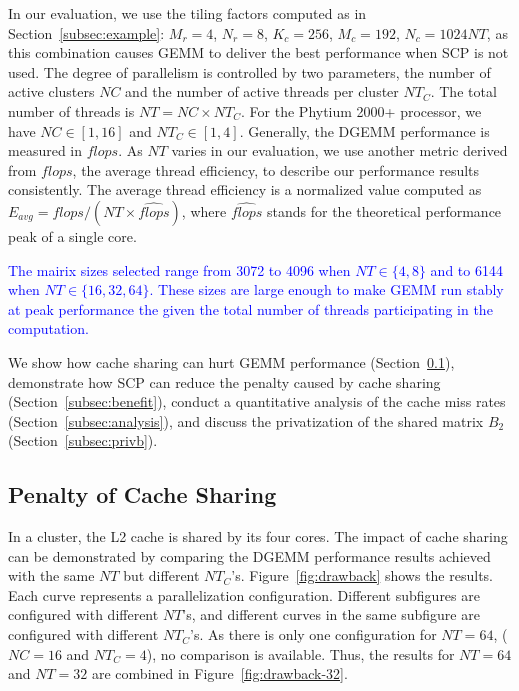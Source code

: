 In our evaluation, we use the tiling factors
computed as in Section~\ref{subsec:example}:
$M_r = 4$, $N_r = 8$, $K_c = 256$, $M_c = 192$, $N_c = 1024NT$,
as this combination causes GEMM to deliver the best performance 
when SCP is not used.
The degree of parallelism is controlled by two parameters,
the number of active clusters $NC$
and the number of active threads per cluster $NT_C$.
The total number of threads is $NT = NC \times NT_C$.
For the Phytium 2000+ processor, we have
$NC \in [1, 16]$ and $NT_C \in [1, 4]$. 
Generally, the DGEMM performance is measured in $flops$.
As $NT$ varies in our evaluation,
we use another metric derived from $flops$,
the average thread efficiency,
to describe our performance results consistently.
The average thread efficiency is a normalized value computed as
$E_{avg} = flops / (NT \times \widehat{flops})$,
where $\widehat{flops}$ stands for the theoretical performance
peak of a single core.

\textcolor{blue}{
The mairix sizes selected range from 3072 to 
4096 when $NT \in \{4, 8\}$ and to 
6144 when $NT \in \{16, 32, 64\}$. 
These sizes are large enough to make GEMM run stably at peak performance
the given the total number of threads participating in the computation.
}

We show how cache sharing can hurt GEMM performance
(Section~\ref{subsec:drawback}),
demonstrate how SCP can reduce
the penalty caused by cache sharing 
(Section~\ref{subsec:benefit}), conduct a 
quantitative analysis of the cache miss rates
(Section~\ref{subsec:analysis}), and
discuss the privatization of the shared matrix $B_2$
(Section~\ref{subsec:privb}).

\subsection{Penalty of Cache Sharing}\label{subsec:drawback}

In a cluster, the L2 cache is shared by its four cores.
The impact of cache sharing can be demonstrated
by comparing the DGEMM performance results achieved
with the same $NT$
but different $NT_C$'s.
Figure~\ref{fig:drawback} shows the results.
Each curve represents a parallelization configuration.
Different subfigures are configured with different $NT$'s,
and different curves in the same subfigure are
configured with different $NT_C$'s.
As there is only one configuration for $NT=64$,
($NC=16$ and $NT_C=4$),
no comparison is available. Thus,
the results for $NT=64$ and $NT=32$ are combined in Figure~\ref{fig:drawback-32}.

